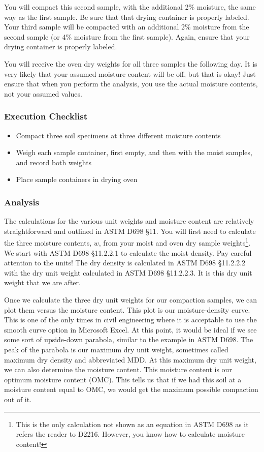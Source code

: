 \documentclass[12pt]{article}
\begin{document}
You will compact this second sample, with the additional 2\% moisture, the same way as the first sample. Be sure that that drying container is properly labeled. Your third sample will be compacted with an additional 2\% moisture from the second sample (or 4\% moisture from the first sample). Again, ensure that your drying container is properly labeled.

You will receive the oven dry weights for all three samples the following day. It is very likely that your assumed moisture content will be off, but that is okay! Just ensure that when you perform the analysis, you use the actual moisture contents, not your assumed values.

\subsubsection*{Execution Checklist}
\begin{itemize}
    \item Compact three soil specimens at three different moisture contents
    \item Weigh each sample container, first empty, and then with the moist samples, and record both weights
    \item Place sample containers in drying oven
\end{itemize}

\subsubsection{Analysis}
The calculations for the various unit weights and moisture content are relatively straightforward and outlined in ASTM D698 \S11. You will first need to calculate the three moisture contents, $w$, from your moist and oven dry sample weights\footnote{This is the only calculation not shown as an equation in ASTM D698 as it refers the reader to D2216. However, you know how to calculate moisture content!}. We start with ASTM D698 \S11.2.2.1 to calculate the moist density. Pay careful attention to the units! The dry density is calculated in ASTM D698 \S11.2.2.2 with the dry unit weight calculated in ASTM D698 \S11.2.2.3. It is this dry unit weight that we are after.

Once we calculate the three dry unit weights for our compaction samples, we can plot them versus the moisture content. This plot is our moisture-density curve. This is one of the only times in civil engineering where it is acceptable to use the smooth curve option in Microsoft Excel\textregistered{}. At this point, it would be ideal if we see some sort of upside-down parabola, similar to the example in ASTM D698. The peak of the parabola is our maximum dry unit weight, sometimes called maximum dry density and abbreviated MDD. At this maximum dry unit weight, we can also determine the moisture content. This moisture content is our optimum moisture content (OMC). This tells us that if we had this soil at a moisture content equal to OMC, we would get the maximum possible compaction out of it.
\end{document}
